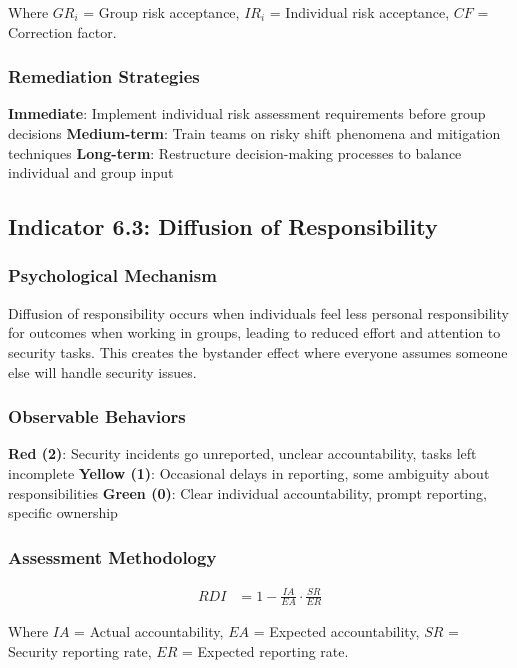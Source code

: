 \documentclass[11pt,a4paper]{article}
\begin{document}
Where $GR_i$ = Group risk acceptance, $IR_i$ = Individual risk acceptance, $CF$ = Correction factor.

\subsubsection{Remediation Strategies}

\textbf{Immediate}: Implement individual risk assessment requirements before group decisions
\textbf{Medium-term}: Train teams on risky shift phenomena and mitigation techniques
\textbf{Long-term}: Restructure decision-making processes to balance individual and group input

\subsection{Indicator 6.3: Diffusion of Responsibility}

\subsubsection{Psychological Mechanism}

Diffusion of responsibility occurs when individuals feel less personal responsibility for outcomes when working in groups, leading to reduced effort and attention to security tasks. This creates the bystander effect where everyone assumes someone else will handle security issues.

\subsubsection{Observable Behaviors}

\textbf{Red (2)}: Security incidents go unreported, unclear accountability, tasks left incomplete
\textbf{Yellow (1)}: Occasional delays in reporting, some ambiguity about responsibilities  
\textbf{Green (0)}: Clear individual accountability, prompt reporting, specific ownership

\subsubsection{Assessment Methodology}

\begin{align}
RDI &= 1 - \frac{IA}{EA} \cdot \frac{SR}{ER}
\end{align}

Where $IA$ = Actual accountability, $EA$ = Expected accountability, $SR$ = Security reporting rate, $ER$ = Expected reporting rate.
\end{document}
